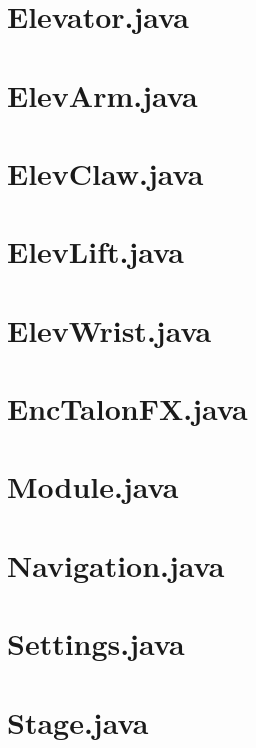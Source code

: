 \documentclass[letterpaper,10pt]{memoir}
\newcommand{\filelister}[1]{%
		
	}
\begin{document}
	\newpage\section*{Elevator.java}
	\filelister{Hardware/Elevator.java}

	\newpage\section*{ElevArm.java}
	\filelister{Hardware/ElevArm.java}

	\newpage\section*{ElevClaw.java}
	\filelister{Hardware/ElevClaw.java}

	\newpage\section*{ElevLift.java}
	\filelister{Hardware/ElevWrist.java}

	\newpage\section*{ElevWrist.java}
	\filelister{Hardware/ElevWrist.java}

	\newpage\section*{EncTalonFX.java}
	\filelister{Hardware/EncTalonFX.java}

	\newpage\section*{Module.java}
	\filelister{Hardware/Module.java}

	\newpage\section*{Navigation.java}
	\filelister{Hardware/Navigation.java}

	\newpage\section*{Settings.java}
	\filelister{Hardware/Settings.java}

	\newpage\section*{Stage.java}
	\filelister{Hardware/Stage.java}
\end{document}
